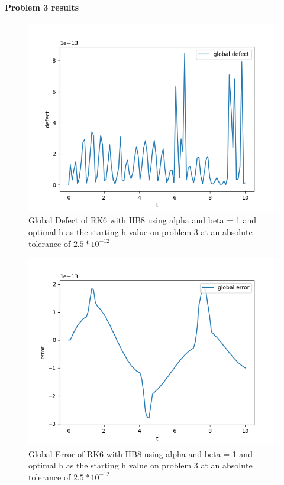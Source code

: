 \documentclass{article}
\begin{document}
\paragraph{Problem 3 results}
\begin{figure}[H]
\centering
\includegraphics[width=0.7\linewidth]{./figures/sharp_tolerance_rk4_with_hb6_p3_global_defect}
\caption{Global Defect of RK6 with HB8 using alpha and beta = 1 and optimal h as the starting h value on problem 3 at an absolute tolerance of $2.5*10^{-12}$}
\label{fig:sharp_tolerance_rk6_with_hb8_p3_global_defect}
\end{figure}

\begin{figure}[H]
\centering
\includegraphics[width=0.7\linewidth]{./figures/sharp_tolerance_rk6_with_hb8_p3_global_error}
\caption{Global Error of RK6 with HB8 using alpha and beta = 1 and optimal h as the starting h value on problem 3 at an absolute tolerance of $2.5*10^{-12}$}
\label{fig:sharp_tolerance_rk6_with_hb8_p3_global_error}
\end{figure}
\end{document}
